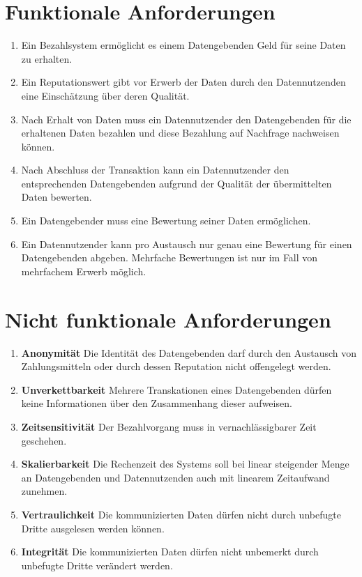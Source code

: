 \documentclass{scrreprt}
\begin{document}
\section{Funktionale Anforderungen}
\label{enum:req:funktional}
\begin{enumerate}
    \item Ein Bezahlsystem ermöglicht es einem Datengebenden Geld für seine Daten zu erhalten.
    \item Ein Reputationswert gibt vor Erwerb der Daten durch den Datennutzenden eine Einschätzung über deren Qualität.
    \item Nach Erhalt von Daten muss ein Datennutzender den Datengebenden für die erhaltenen Daten bezahlen und diese Bezahlung auf Nachfrage nachweisen können.
    \item Nach Abschluss der Transaktion kann ein Datennutzender den entsprechenden Datengebenden aufgrund der Qualität der übermittelten Daten bewerten.
    \item Ein Datengebender muss eine Bewertung seiner Daten ermöglichen.
    \item Ein Datennutzender kann pro Austausch nur genau eine Bewertung für einen Datengebenden abgeben. Mehrfache Bewertungen ist nur im Fall von mehrfachem Erwerb möglich.
\end{enumerate}

\section{Nicht funktionale Anforderungen}
\label{enum:req:nichtfunktional}
\begin{enumerate}
    \item \textbf{Anonymität} Die Identität des Datengebenden darf durch den Austausch von Zahlungsmitteln oder durch dessen Reputation nicht offengelegt werden.
    \item \textbf{Unverkettbarkeit} Mehrere Transkationen eines Datengebenden dürfen keine Informationen über den Zusammenhang dieser aufweisen. 
    \item \textbf{Zeitsensitivität} Der Bezahlvorgang muss in vernachlässigbarer Zeit geschehen.
    \item \textbf{Skalierbarkeit} Die Rechenzeit des Systems soll bei linear steigender Menge an Datengebenden und Datennutzenden auch mit linearem Zeitaufwand zunehmen.
    \item \textbf{Vertraulichkeit} Die kommunizierten Daten dürfen nicht durch unbefugte Dritte ausgelesen werden können.
    \item \textbf{Integrität} Die kommunizierten Daten dürfen nicht unbemerkt durch unbefugte Dritte verändert werden.
\end{enumerate}
\end{document}
